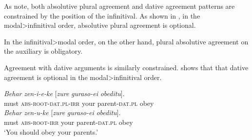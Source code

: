 \documentclass[output=paper]{langscibook}
\begin{document}
As \cite{etxepare-uribeetxebarria2009} note, both absolutive plural agreement and dative agreement patterns are constrained by the position of the infinitival.  As shown in , in the mo\-dal>in\-fin\-i\-ti\-val order, absolutive plural agreement is optional.
 
\ea \label{ex:haddican:22} 
    \citep{etxepare-uribeetxebarria2009}
\z\z

In the in\-fin\-i\-ti\-val>mo\-dal order, on the other hand, plural absolutive agreement on the auxiliary is obligatory.

\ea	
{}
        \citep{etxepare-uribeetxebarria2009}
\z\z
 
Agreement with dative arguments is similarly constrained.   shows that that dative agreement is optional in the mo\-dal>in\-fin\-i\-ti\-val order. 
 
\ea \label{ex:haddican:24} 
	\ea \gll  	\textit{Behar}  \textit{zen-i-e-ke}   [\textit{zure} \textit{guraso-ei}   \textit{obeditu}]. \\
             	must   \textsc{abs-root-dat.pl-irr}    your parent-\textsc{dat.pl}   obey  \\
 	\ex \gll 	\textit{Behar} \textit{zen-u-ke}    [\textit{zure}  \textit{guraso-ei} \textit{obeditu}]. \\
 	    must   \textsc{abs-root-irr}   your parent-\textsc{dat.pl}   obey    \\    
 	\glt  	`You should obey your parents.'\\
    \citep{etxepare-uribeetxebarria2009}
\z\z	
\end{document}
